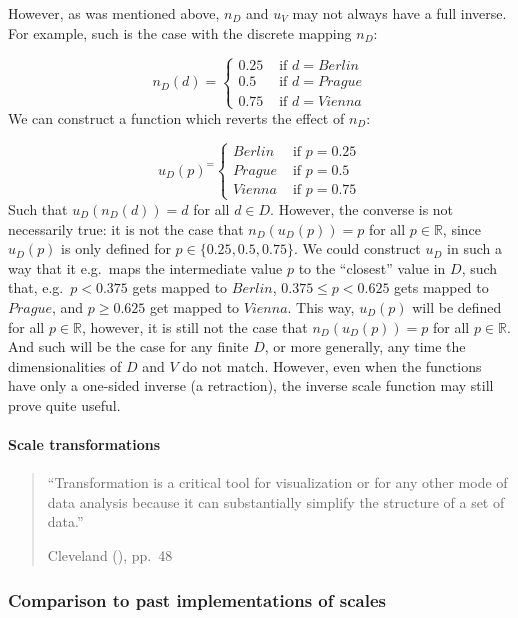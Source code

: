 \documentclass[
]{book}
\theoremstyle{definition}
\theoremstyle{definition}
\theoremstyle{definition}
\theoremstyle{definition}
\theoremstyle{remark}
\begin{document}
However, as was mentioned above, \(n_D\) and \(u_V\) may not always have a full inverse. For example, such is the case with the discrete mapping \(n_D\):

\[n_D(d) = \begin{cases} 0.25 & \text{ if } d = Berlin \\ 0.5 & \text{ if } d = Prague \\ 0.75 & \text{ if } d = Vienna  \end{cases}\]
We can construct a function which reverts the effect of \(n_D\):

\[u_D(p)^ = \begin{cases} Berlin & \text{ if } p = 0.25 \\ Prague & \text{ if } p = 0.5 \\ Vienna & \text{ if } p = 0.75  \end{cases}\]
Such that \(u_D(n_D(d)) = d\) for all \(d \in D\). However, the converse is not necessarily true: it is not the case that \(n_D(u_D(p)) = p\) for all \(p \in \mathbb{R}\), since \(u_D(p)\) is only defined for \(p \in \{ 0.25, 0.5, 0.75 \}\). We could construct \(u_D\) in such a way that it e.g.~maps the intermediate value \(p\) to the ``closest'' value in \(D\), such that, e.g.~\(p < 0.375\) gets mapped to \(Berlin\), \(0.375 \leq p < 0.625\) gets mapped to \(Prague\), and \(p \geq 0.625\) get mapped to \(Vienna\). This way, \(u_D(p)\) will be defined for all \(p \in \mathbb{R}\), however, it is still not the case that \(n_D(u_D(p)) = p\) for all \(p \in \mathbb{R}\). And such will be the case for any finite \(D\), or more generally, any time the dimensionalities of \(D\) and \(V\) do not match. However, even when the functions have only a one-sided inverse (a retraction), the inverse scale function may still prove quite useful.

\paragraph{Scale transformations}\label{scale-transformations}

\begin{quote}
``Transformation is a critical tool for visualization or for any other mode of data analysis
because it can substantially simplify the structure of a set of data.''

Cleveland (), pp.~48
\end{quote}

\subsubsection{Comparison to past implementations of scales}\label{comparison-to-past-implementations-of-scales}
\end{document}
